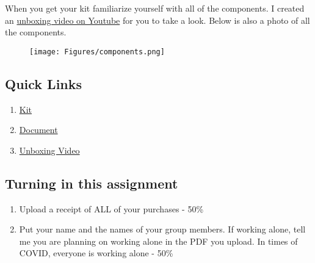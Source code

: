 \documentclass{article}
\begin{document}
When you get your kit familiarize yourself with all of the
components. I created an
\href{https://youtu.be/6sNNQrhnzLE}{unboxing video on Youtube} for you
to take a look. Below is also a photo of all the components.
\begin{figure}[H]
  \begin{center}
    \texttt{[image: Figures/components.png]}
  \end{center}
\end{figure}

\subsection{Quick Links}

\begin{enumerate}[itemsep=-5pt]
  \item \href{https://www.tangiblesthatteach.com/product-page/instrumentation-kit-for-me-316}{Kit}
  \item \href{https://a2279211-28c1-4f46-9477-0d3265900c7f.filesusr.com/ugd/2413aa_ca39175b0a514b838ec96893b90590eb.pdf}{Document}
  \item \href{https://youtu.be/6sNNQrhnzLE}{Unboxing Video}
\end{enumerate}

\subsection{Turning in this assignment}

\begin{enumerate}[itemsep=-5pt]
  \item Upload a receipt of ALL of your purchases - 50\%
  \item Put your name and the names of your group members. If working
    alone, tell me you are planning on working alone in the PDF you
    upload. In times of COVID, everyone is working alone - 50\%
\end{enumerate}
\end{document}
